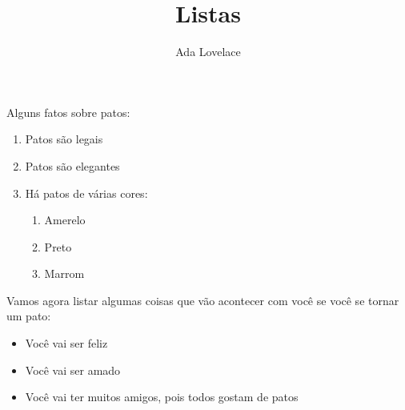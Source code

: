 \documentclass[12pt, a4paper]{article}
\title{Listas}
\author{Ada Lovelace}
\begin{document}
  \maketitle

  Alguns fatos sobre patos:

  \begin{enumerate}
    \item Patos são legais
    \item Patos são elegantes
    \item Há patos de várias cores:
    \begin{enumerate}
      \item Amerelo
      \item Preto
      \item Marrom
    \end{enumerate}
  \end{enumerate}

  Vamos agora listar algumas coisas que vão acontecer com você se você se tornar um pato:

  \begin{itemize}
    \item Você vai ser feliz
    \item Você vai ser amado
    \item Você vai ter muitos amigos, pois todos gostam de patos
  \end{itemize}
\end{document}
